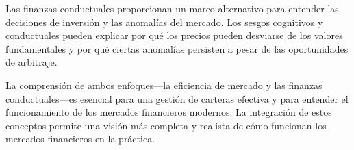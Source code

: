 Las finanzas conductuales proporcionan un marco alternativo para entender las decisiones de inversión y las anomalías del mercado. Los sesgos cognitivos y conductuales pueden explicar por qué los precios pueden desviarse de los valores fundamentales y por qué ciertas anomalías persisten a pesar de las oportunidades de arbitraje.

La comprensión de ambos enfoques—la eficiencia de mercado y las finanzas conductuales—es esencial para una gestión de carteras efectiva y para entender el funcionamiento de los mercados financieros modernos. La integración de estos conceptos permite una visión más completa y realista de cómo funcionan los mercados financieros en la práctica.



